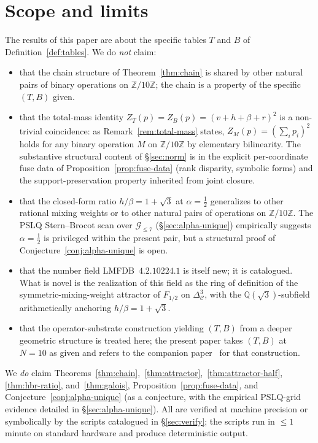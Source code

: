 \documentclass[11pt,reqno]{amsart}
\theoremstyle{plain}
\theoremstyle{definition}
\theoremstyle{remark}
\newcommand{\Z}{\mathbb{Z}}
\newcommand{\Q}{\mathbb{Q}}
\newcommand{\Zten}{\Z/10\Z}
\newcommand{\Cfour}{\mathcal{C}}
\begin{document}
\section{Scope and limits}\label{sec:scope}

The results of this paper are about the specific tables $T$ and
$B$ of Definition~\ref{def:tables}. We do \emph{not} claim:
\begin{itemize}\setlength\itemsep{0pt}
\item that the chain structure of Theorem~\ref{thm:chain} is
shared by other natural pairs of binary operations on $\Zten$;
the chain is a property of the specific $(T, B)$ given.
\item that the total-mass identity
$Z_{T}(p) = Z_{B}(p) = (v + h + \beta + r)^{2}$ is a
non-trivial coincidence: as Remark~\ref{rem:total-mass} states,
$Z_{M}(p) = (\sum_{i}p_{i})^{2}$ holds for any binary operation
$M$ on $\Zten$ by elementary bilinearity. The substantive
structural content of \S\ref{sec:norm} is in the explicit
per-coordinate fuse data of Proposition~\ref{prop:fuse-data}
(rank disparity, symbolic forms) and the support-preservation
property inherited from joint closure.
\item that the closed-form ratio $h/\beta = 1+\sqrt{3}$ at
$\alpha = \tfrac12$ generalizes to other rational mixing
weights or to other natural pairs of operations on $\Zten$. The
PSLQ Stern--Brocot scan over $\mathcal{G}_{\le 7}$ (\S\ref{sec:alpha-unique})
empirically suggests $\alpha = \tfrac12$ is privileged within the
present pair, but a structural proof of
Conjecture~\ref{conj:alpha-unique} is open.
\item that the number field LMFDB~$4.2.10224.1$ is itself new;
it is catalogued. What is novel is the realization of this field
as the ring of definition of the symmetric-mixing-weight
attractor of $F_{1/2}$ on $\Delta^{3}_{\Cfour}$, with the
$\Q(\sqrt{3})$-subfield arithmetically anchoring
$h/\beta = 1+\sqrt{3}$.
\item that the operator-substrate construction yielding $(T, B)$
from a deeper geometric structure is treated here; the present
paper takes $(T, B)$ at $N = 10$ as given and refers to the
companion paper~\cite{SandersGish2026Sigma} for that construction.
\end{itemize}

We \emph{do} claim
Theorems~\ref{thm:chain},~\ref{thm:attractor},~\ref{thm:attractor-half},
\ref{thm:hbr-ratio}, and~\ref{thm:galois},
Proposition~\ref{prop:fuse-data}, and
Conjecture~\ref{conj:alpha-unique} (as a conjecture, with the
empirical PSLQ-grid evidence detailed in
\S\ref{sec:alpha-unique}). All are verified at machine precision
or symbolically by the scripts catalogued in \S\ref{sec:verify};
the scripts run in $\le 1$ minute on standard hardware and
produce deterministic output.
\end{document}
